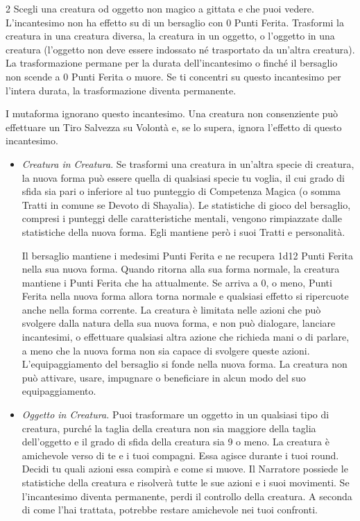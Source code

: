 \begin{multicols}{2}
Scegli una creatura od oggetto non magico a gittata e che puoi vedere. L'incantesimo non ha effetto su di un bersaglio con 0 Punti Ferita. Trasformi la creatura in una creatura diversa, la creatura in un oggetto, o l'oggetto in una creatura (l'oggetto non deve essere indossato né trasportato da un'altra creatura). La trasformazione permane per la durata dell'incantesimo o finché il bersaglio non scende a 0 Punti Ferita o muore. Se ti concentri su questo incantesimo per l'intera durata, la trasformazione diventa permanente.

I mutaforma ignorano questo incantesimo. Una creatura non consenziente può effettuare un Tiro Salvezza su Volontà e, se lo supera, ignora l'effetto di questo incantesimo.

\begin{itemize}[leftmargin=*] \setlength{\itemsep}{0pt}
	\item \emph{Creatura in Creatura}. Se trasformi una creatura in un'altra specie di creatura, la nuova forma può essere quella di qualsiasi specie tu voglia, il cui grado di sfida sia pari o inferiore al tuo punteggio di Competenza Magica (o somma Tratti in comune se Devoto di Shayalia). Le statistiche di gioco del bersaglio, compresi i punteggi delle caratteristiche mentali, vengono rimpiazzate dalle statistiche della nuova forma. Egli mantiene però i suoi Tratti e personalità.

	Il bersaglio mantiene i medesimi Punti Ferita e ne recupera 1d12 Punti Ferita nella sua nuova forma. Quando ritorna alla sua forma normale, la creatura mantiene i Punti Ferita che ha attualmente. Se arriva a 0, o meno, Punti Ferita nella nuova forma allora torna normale e qualsiasi effetto si ripercuote anche nella forma corrente. La creatura è limitata nelle azioni che può svolgere dalla natura della sua nuova forma, e non può dialogare, lanciare incantesimi, o effettuare qualsiasi altra azione che richieda mani o di parlare, a meno che la nuova forma non sia capace di svolgere queste azioni. L'equipaggiamento del bersaglio si fonde nella nuova forma. La creatura non può attivare, usare, impugnare o beneficiare in alcun modo del suo equipaggiamento.

	\item \emph{Oggetto in Creatura.} Puoi trasformare un oggetto in un qualsiasi tipo di creatura, purché la taglia della creatura non sia maggiore della taglia dell'oggetto e il grado di sfida della creatura sia 9 o meno. La creatura è amichevole verso di te e i tuoi compagni. Essa agisce durante i tuoi round. Decidi tu quali azioni essa compirà e come si muove. Il Narratore possiede le statistiche della creatura e risolverà tutte le sue azioni e i suoi movimenti.
	Se l'incantesimo diventa permanente, perdi il controllo della creatura. A seconda di come l'hai trattata, potrebbe restare amichevole nei tuoi confronti.


\end{itemize}
\end{multicols}

